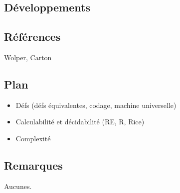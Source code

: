 \documentclass[../../agregation.tex]{subfiles}
\begin{document}

\subsection{Développements}

\dvts

\subsection{Références}

Wolper, Carton

\subsection{Plan}

\begin{itemize}
	\item Défs (défs équivalentes, codage, machine universelle)
	\item Calculabilité et décidabilité (RE, R, Rice)
	\item Complexité
\end{itemize}

\subsection{Remarques}

Aucunes.
\end{document}
